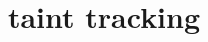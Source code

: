 \graphicspath{{./figures/}}
\title{taint tracking}
\date{}

\begin{frame}
    \titlepage
\end{frame}






